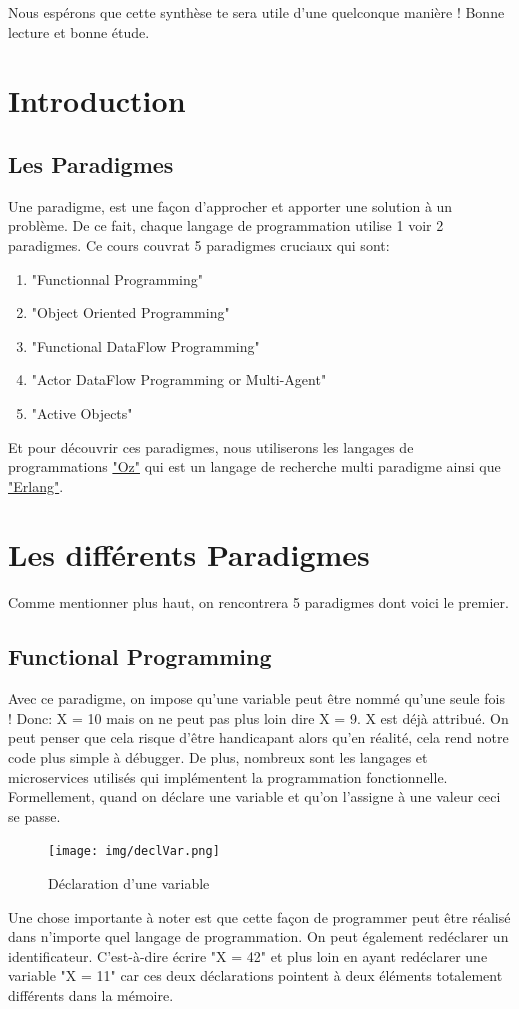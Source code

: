 \documentclass{report}
\begin{document}
Nous espérons que cette synthèse te sera utile d'une quelconque manière ! Bonne lecture et bonne étude.


\chapter{Introduction}
\section{Les Paradigmes}
Une paradigme, est une façon d'approcher et apporter une solution à un problème. De ce fait, chaque langage de programmation utilise 1 voir 2 paradigmes. Ce cours couvrat 5 paradigmes cruciaux qui sont:
\begin{enumerate}
\item "Functionnal Programming"
\item "Object Oriented Programming"
\item "Functional DataFlow Programming"
\item "Actor DataFlow Programming or Multi-Agent"
\item "Active Objects"
\end{enumerate}

Et pour découvrir ces paradigmes, nous utiliserons les langages de programmations \href{https://fr.wikipedia.org/wiki/Oz_(langage)}{"Oz"} qui est un langage de recherche multi paradigme ainsi que \href{https://fr.wikipedia.org/wiki/Erlang_(langage)}{"Erlang"}.

\chapter{Les différents Paradigmes}
Comme mentionner plus haut, on rencontrera 5 paradigmes dont voici le premier.
\section{Functional Programming}
Avec ce paradigme, on impose qu'une variable peut être nommé qu'une seule fois ! Donc: \quad X = 10 mais on ne peut pas plus loin dire X = 9. X est déjà attribué. On peut penser que cela risque d'être handicapant alors qu'en réalité, cela rend notre code plus simple à débugger. De plus, nombreux sont les langages et microservices utilisés qui implémentent la programmation fonctionnelle.
Formellement, quand on déclare une variable et qu'on l'assigne à une valeur ceci se passe.
\begin{figure}
	\centering
    \texttt{[image: img/declVar.png]}
    \caption{Déclaration d'une variable}
\end{figure}
Une chose importante à noter est que cette façon de programmer peut être réalisé dans n'importe quel langage de programmation. On peut également redéclarer un identificateur. C'est-à-dire écrire "X = 42" et plus loin en ayant redéclarer une variable "X = 11" car ces deux déclarations pointent à deux éléments totalement différents dans la mémoire.\\
\end{document}
